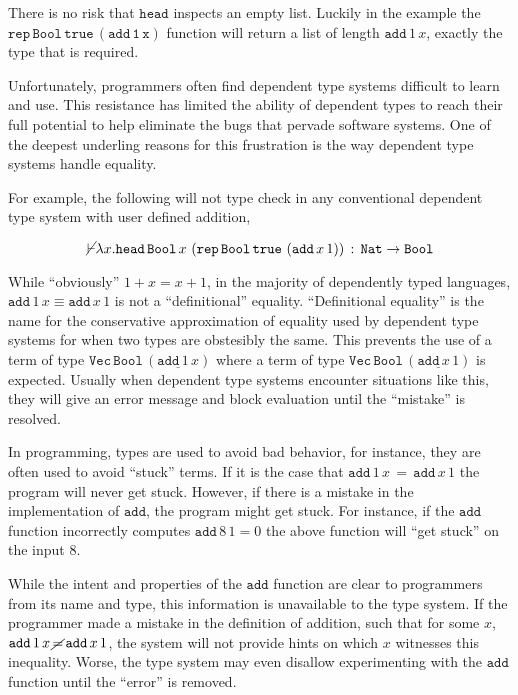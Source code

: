 There is no risk that $\mathtt{head}$ inspects an empty list.
Luckily in the example the $\mathtt{\mathtt{rep}\,\mathtt{Bool}\,\mathtt{true}\,\left(\mathtt{add}\,1\,x\right)}$ function will return a list of length $\mathtt{add}\,1\,x$, exactly the type that is required.


Unfortunately, programmers often find dependent type systems difficult to learn and use.
This resistance has limited the ability of dependent types to reach their full potential to help eliminate the bugs that pervade software systems.
One of the deepest underling reasons for this frustration is the way dependent type systems handle equality.

For example, the following will not type check in any conventional dependent type system with user defined addition,

\[
\cancel{\vdash}\lambda x.\mathtt{head}\,\mathtt{Bool}\,x\,\left(\mathtt{rep}\,\mathtt{Bool}\,\mathtt{true}\,\left(\mathtt{add}\,x\,1\right)\right)\,:\,\mathtt{Nat}\rightarrow\mathtt{Bool}
\]

While ``obviously'' $1+x=x+1$, in the majority of dependently typed languages, $\mathtt{add}\,1\,x\equiv\mathtt{add}\,x\,1$ is not a ``definitional'' equality.
``Definitional equality'' is the name for the conservative approximation of equality used by dependent type systems for when two types are obstesibly the same.
This prevents the use of a term of type
$\mathtt{Vec}\,\mathtt{Bool}\,\left(\underline{\mathtt{add}\,1\,x}\right)$
where a term of type
$\mathtt{Vec}\,\mathtt{Bool}\,\left(\underline{\mathtt{add}\,x\,1}\right)$
is expected.
Usually when dependent type systems encounter situations like this, they will give an error message and block evaluation until the ``mistake'' is resolved.

In programming, types are used to avoid bad behavior, for instance, they are often used to avoid ``stuck'' terms.
If it is the case that $\mathtt{add}\,1\,x\,=\,\mathtt{add}\,x\,1$ the program will never get stuck.
However, if there is a mistake in the implementation of $\mathtt{add}$, the program might get stuck.
For instance, if the $\mathtt{add}$ function incorrectly computes $\mathtt{add}\,8\,1=0$ the above function will ``get stuck'' on the input $8$. 

While the intent and properties of the $\mathtt{add}$ function are clear to programmers from its name and type, this information is unavailable to the type system.
If the programmer made a mistake in the definition of addition, such that for some $x$, $\mathtt{add}\,1\,x\,\cancel{=}\,\mathtt{add}\,x\,1$, the system will not provide hints on which $x$ witnesses this inequality.
Worse, the type system may even disallow experimenting with the $\mathtt{add}$ function until the ``error'' is removed.

